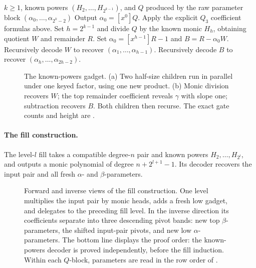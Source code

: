 \begin{algorithm}[H]
  \caption{Decoder summary for $Q_{2^k-1}$ from known powers}\label{alg:decode-Q-2kminus1}
  \begin{algorithmic}
    \Require $k\ge1$, known powers $(H_2,\ldots,H_{2^{k-1}})$, and
      $Q$ produced by 
    \Ensure the raw parameter block $(\alpha_0,\ldots,\alpha_{2^k-2})$
      \State Output $\alpha_0=[x^0]Q$.
      \State Apply the explicit $Q_3$ coefficient formulas above.
    \Else
      \State Set $h=2^{k-1}$ and divide $Q$ by the known monic $H_h$,
        obtaining quotient $W$ and remainder $R$.
      \State Set $\alpha_0=[x^{h-1}]R-1$ and $B=R-\alpha_0W$.
      \State Recursively decode $W$ to recover $(\alpha_1,\ldots,\alpha_{h-1})$.
      \State Recursively decode $B$ to recover $(\alpha_h,\ldots,\alpha_{2h-2})$.
    \EndIf
  \end{algorithmic}
\end{algorithm}

\begin{figure}[H]
  \centering
  \resizebox{\textwidth}{!}{}
  \caption{The known-powers gadget.  (a) Two half-size children run in
  parallel under one keyed factor, using one new product.
  (b) Monic division recovers $W$; the top remainder coefficient reveals
  $\gamma$ with slope one; subtraction recovers $B$.  Both children then
  recurse.  The exact gate counts and height are
  .}
  \label{fig:peeled-Q}
\end{figure}

\paragraph{The fill construction.}
The level-$l$ fill takes a compatible degree-$n$ pair and known powers
$H_2,\ldots,H_{2^l}$, and outputs a monic polynomial of degree
$n+2^{l+1}-1$.  Its decoder recovers the input pair and all fresh
$\alpha$- and $\beta$-parameters.

\begin{figure}[H]
  \centering
  \resizebox{\textwidth}{!}{}
  \caption{Forward and inverse views of the fill construction.  One level
  multiplies the input pair by monic heads, adds a fresh low gadget, and
  delegates to the preceding fill level.  In the inverse direction its
  coefficients separate into three descending pivot bands: new top
  $\beta$-parameters, the shifted input-pair pivots, and new low
  $\alpha$-parameters.  The bottom line displays the proof order:
  the known-powers decoder is proved independently, before the fill induction.
  Within each $Q$-block, parameters are read in the row order of
  .}
  \label{fig:fill-slots}
\end{figure}

